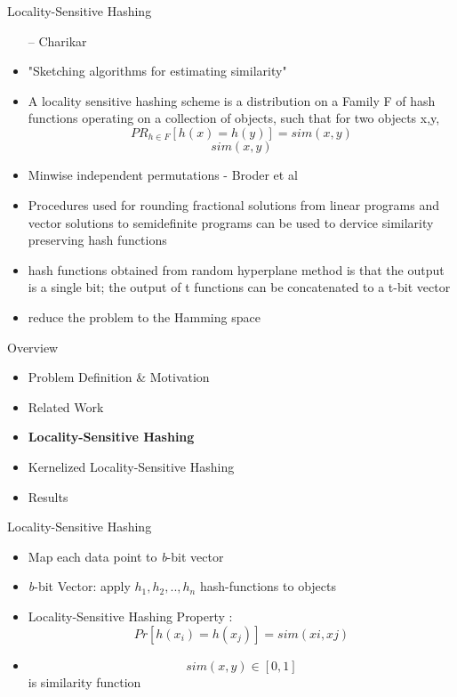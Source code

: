 \documentclass[12pt,a4paper]{beamer}
\begin{document}
\begin{frame}{Locality-Sensitive Hashing}
\begin{itemize}
-- Charikar
\item "Sketching algorithms for estimating similarity"
\item A locality sensitive hashing scheme is a distribution on a Family F
of hash functions operating on a collection of objects, such that for two objects
x,y,
$$PR_{h \in F}[h(x)=h(y)] = sim(x,y)$$
$$sim(x,y)$$
\item Minwise independent permutations - Broder et al
\item Procedures used for rounding fractional solutions from linear programs and
vector solutions to semidefinite programs can be used to dervice similarity preserving
hash functions
\item hash functions obtained from random hyperplane method is that the output
is a single bit; the output of t functions can be concatenated to a t-bit vector
\item reduce the problem to the Hamming space
\end{itemize}
\end{frame}

\begin{frame}{Overview}
\begin{itemize}
\item Problem Definition & Motivation
\item Related Work
\item \textbf{Locality-Sensitive Hashing}
\item Kernelized Locality-Sensitive Hashing
\item Results
\end{itemize}
\end{frame}





\begin{frame}{Locality-Sensitive Hashing}
\begin{itemize}
\item Map each data point to \textit{b}-bit vector
\item \textit{b}-bit Vector: apply $h_1,h_2,..,h_n$ hash-functions to objects
\item Locality-Sensitive Hashing Property \cite{lsh}:
$$Pr[h(x_i)=h(x_j)]=sim(xi,xj)$$
\item $$sim(x,y) \in [0,1]$$ is similarity function
\end{itemize}
\end{frame}
\end{document}
